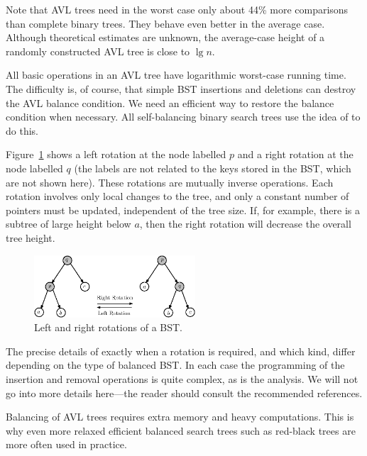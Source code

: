 Note that AVL trees need in the worst case only about 44\% more comparisons than
complete binary trees. They behave even better in the average case. 
Although theoretical estimates are unknown, the average-case height of a
randomly constructed AVL tree is close to $\lg n$. 

All basic operations in an AVL tree have logarithmic worst-case running time. 
The difficulty is, of course, that simple BST insertions and deletions can 
destroy the AVL balance condition. We need an efficient way to restore the 
balance condition when necessary. All self-balancing binary search trees use 
the idea of  to do this.

\begin{Example}\label{ex:rotation}
Figure~\ref{fig:treerotation} shows a left rotation at the node labelled $p$ and 
a right rotation at the node labelled $q$ (the labels are not related to the 
keys stored in the BST, which are not shown here). These rotations are mutually 
inverse operations. Each rotation involves only local changes to the tree, 
and only a constant number of pointers must be updated, independent of the tree 
size. If, for example, there is a subtree of large height below $a$, then the 
right rotation will decrease the overall tree height.

\begin{figure}[htb]
\begin{center}
\includegraphics[width=6cm]{figs/treerotation}
\caption{\label{fig:treerotation}Left and right rotations of a BST.}
\end{center}
\end{figure}

\end{Example}

The precise details of exactly when a rotation is required, and which kind, 
differ depending on the type of balanced BST. In each case the programming of
the insertion and removal operations is quite complex, as is the analysis. 
We will not go into more details here---the reader should consult the  
recommended references.

Balancing of AVL trees requires extra memory and heavy
computations. This is why even more relaxed efficient balanced search
trees such as red-black trees are more often used in practice.

